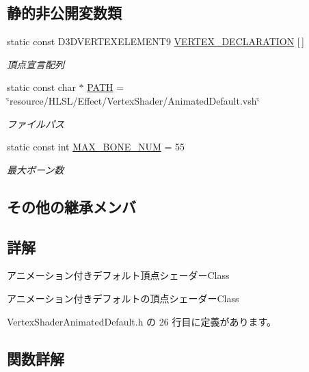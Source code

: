 \subsection*{静的非公開変数類}
\begin{DoxyCompactItemize}
\item 
static const D3\+D\+V\+E\+R\+T\+E\+X\+E\+L\+E\+M\+E\+N\+T9 \mbox{\hyperlink{class_vertex_shader_animated_default_ab2b136b8350457a6113a5ffe28d359e3}{V\+E\+R\+T\+E\+X\+\_\+\+D\+E\+C\+L\+A\+R\+A\+T\+I\+ON}} \mbox{[}$\,$\mbox{]}
\begin{DoxyCompactList}\small\item\em 頂点宣言配列 \end{DoxyCompactList}\item 
static const char $\ast$ \mbox{\hyperlink{class_vertex_shader_animated_default_a0728252117c1440a94a194d26e5bcce1}{P\+A\+TH}} = \char`\"{}resource/H\+L\+SL/Effect/Vertex\+Shader/Animated\+Default.\+vsh\char`\"{}
\begin{DoxyCompactList}\small\item\em ファイルパス \end{DoxyCompactList}\item 
static const int \mbox{\hyperlink{class_vertex_shader_animated_default_aa703d290c4ce5aa16f8d030fc58bceea}{M\+A\+X\+\_\+\+B\+O\+N\+E\+\_\+\+N\+UM}} = 55
\begin{DoxyCompactList}\small\item\em 最大ボーン数 \end{DoxyCompactList}\end{DoxyCompactItemize}
\subsection*{その他の継承メンバ}


\subsection{詳解}
アニメーション付きデフォルト頂点シェーダー\+Class 

アニメーション付きデフォルトの頂点シェーダー\+Class 

 Vertex\+Shader\+Animated\+Default.\+h の 26 行目に定義があります。



\subsection{関数詳解}
\mbox{\label{class_vertex_shader_animated_default_a974cb247b42cb1c9288a9de9ed9048e9}} 
